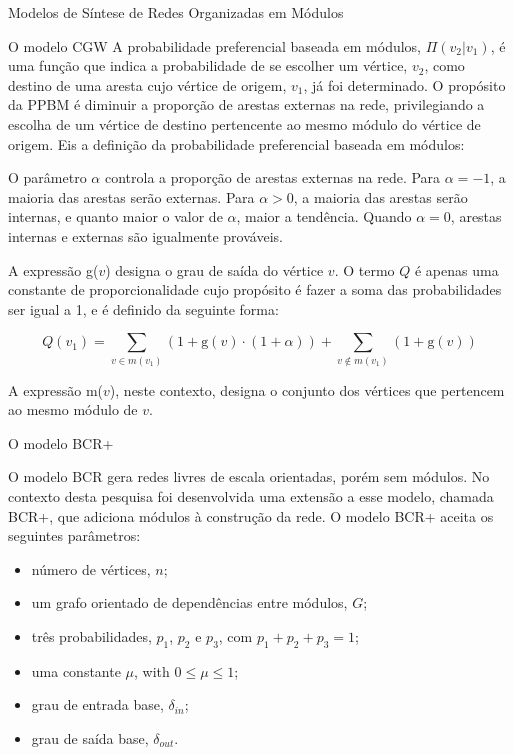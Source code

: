 \begin{section}{Modelos de Síntese de Redes Organizadas em Módulos}
\begin{subsection}{O modelo CGW}
A probabilidade preferencial baseada em módulos, $\Pi(v_2|v_1)$, é uma função que indica a probabilidade de se escolher um vértice, $v_2$, como destino de uma aresta cujo vértice de origem, $v_1$, já foi determinado. O propósito da PPBM é diminuir a proporção de arestas externas na rede, privilegiando a escolha de um vértice de destino pertencente ao mesmo módulo do vértice de origem. Eis a definição da probabilidade preferencial baseada em módulos:

% 

O parâmetro $\alpha$ controla a proporção de arestas externas na rede. Para $\alpha = -1$, a maioria das arestas serão externas. Para $\alpha > 0$, a maioria das arestas serão internas, e quanto maior o valor de $\alpha$, maior a tendência. Quando $\alpha = 0$, arestas internas e externas são igualmente prováveis.

A expressão g($v$) designa o grau de saída do vértice $v$. O termo $Q$ é apenas uma constante de proporcionalidade cujo propósito é fazer a soma das probabilidades ser igual a 1, e é definido da seguinte forma:

$$
Q(v_1) = \sum_{v \in m(v_1)} (1 + \mathrm{g}(v) \cdot (1 + \alpha))
+ \sum_{v \notin m(v_1)} (1 + \mathrm{g}(v))
$$

A expressão m($v$), neste contexto, designa o conjunto dos vértices que pertencem ao mesmo módulo de $v$.

\end{subsection}

\begin{subsection}{O modelo BCR+}

\newcommand{\din}[0]{\ensuremath{\delta_{in}}}
\newcommand{\dout}[0]{\ensuremath{\delta_{out}}}

O modelo BCR \cite{Bollobas2003} gera redes livres de escala orientadas, porém sem módulos. No contexto desta pesquisa foi desenvolvida uma extensão a esse modelo, chamada BCR+, que adiciona módulos à construção da rede. O modelo BCR+ aceita os seguintes parâmetros:

\begin{itemize}
\item número de vértices, $n$;
\item um grafo orientado de dependências entre módulos, $G$;
\item três probabilidades, $p_1$, $p_2$ e $p_3$, com $p_1 + p_2 + p_3 = 1$;
\item uma constante $\mu$, with $0 \le \mu \le 1$;
\item grau de entrada base, $\din$;
\item grau de saída base, $\dout$.
\end{itemize}


\end{subsection}
\end{section}
